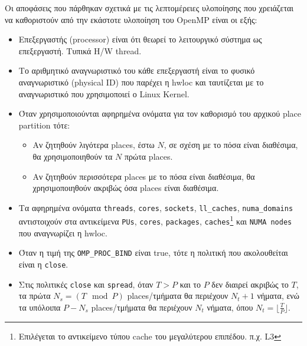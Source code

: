 Οι αποφάσεις που πάρθηκαν σχετικά με τις λεπτομέρειες υλοποίησης που χρειάζεται να καθοριστούν από την εκάστοτε υλοποίηση του OpenMP είναι οι εξής:
\begin{itemize}
	\item Επεξεργαστής (processor) είναι ότι θεωρεί το λειτουργικό σύστημα ως επεξεργαστή. Τυπικά H/W thread.
	\item Το αριθμητικό αναγνωριστικό του κάθε επεξεργαστή είναι το φυσικό αναγνωριστικό (physical ID) που παρέχει η hwloc και ταυτίζεται με το αναγνωριστικό που χρησιμοποιεί ο Linux Kernel.
	\item Όταν χρησιμοποιούνται αφηρημένα ονόματα για τον καθορισμό του αρχικού place partition τότε:
		\begin{itemize}
			\item Αν ζητηθούν λιγότερα places, έστω $N$, σε σχέση με το πόσα είναι διαθέσιμα, θα χρησιμοποιηθούν τα $N$ πρώτα places.
			\item Αν ζητηθούν περισσότερα places με το πόσα είναι διαθέσιμα, θα χρησιμοποιηθούν ακριβώς όσα places είναι διαθέσιμα.
		\end{itemize}
	\item Τα αφηρημένα ονόματα \texttt{threads}, \texttt{cores}, \texttt{sockets}, \texttt{ll\_caches}, \texttt{numa\_domains} αντιστοιχούν στα αντικείμενα \texttt{PUs}, \texttt{cores}, \texttt{packages}, \texttt{caches}\footnote{Επιλέγεται το αντικείμενο τύπου cache του μεγαλύτερου επιπέδου. π.χ. L3} και \texttt{NUMA nodes} που αναγνωρίζει η hwloc.
	\item Όταν η τιμή της \texttt{OMP\_PROC\_BIND} είναι true, τότε η πολιτική που ακολουθείται είναι η \texttt{close}.
	\item Στις πολιτικές \texttt{close} και \texttt{spread}, όταν $T > P$ και το $P$ δεν διαιρεί ακριβώς το $T$, τα πρώτα $N_s = (T \mod P)$ places/τμήματα θα περιέχουν $N_t + 1$ νήματα, ενώ τα υπόλοιπα $P - N_s$ places/τμήματα θα περιέχουν $N_t$ νήματα, όπου $N_t = \lfloor \frac{T}{P} \rfloor$.
\end{itemize}